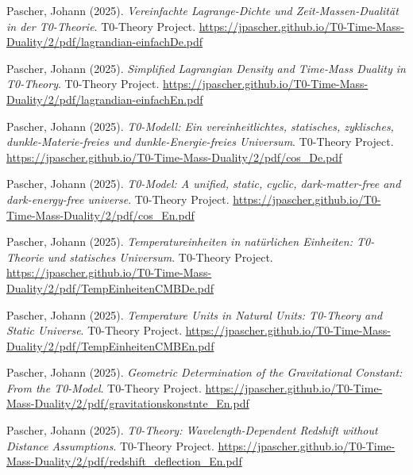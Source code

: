 \documentclass[12pt,a4paper]{article}
\theoremstyle{definition}
\begin{document}
	
	\begin{thebibliography}{99}
		
		Pascher, Johann (2025). 
		\textit{Vereinfachte Lagrange-Dichte und Zeit-Massen-Dualität in der T0-Theorie}. 
		T0-Theory Project. 
		\url{https://jpascher.github.io/T0-Time-Mass-Duality/2/pdf/lagrandian-einfachDe.pdf}
		
		Pascher, Johann (2025). 
		\textit{Simplified Lagrangian Density and Time-Mass Duality in T0-Theory}. 
		T0-Theory Project. 
		\url{https://jpascher.github.io/T0-Time-Mass-Duality/2/pdf/lagrandian-einfachEn.pdf}
		
		Pascher, Johann (2025). 
		\textit{T0-Modell: Ein vereinheitlichtes, statisches, zyklisches, dunkle-Materie-freies und dunkle-Energie-freies Universum}. 
		T0-Theory Project. 
		\url{https://jpascher.github.io/T0-Time-Mass-Duality/2/pdf/cos_De.pdf}
		
		Pascher, Johann (2025). 
		\textit{T0-Model: A unified, static, cyclic, dark-matter-free and dark-energy-free universe}. 
		T0-Theory Project. 
		\url{https://jpascher.github.io/T0-Time-Mass-Duality/2/pdf/cos_En.pdf}
		
		Pascher, Johann (2025). 
		\textit{Temperatureinheiten in natürlichen Einheiten: T0-Theorie und statisches Universum}. 
		T0-Theory Project. 
		\url{https://jpascher.github.io/T0-Time-Mass-Duality/2/pdf/TempEinheitenCMBDe.pdf}
		
		Pascher, Johann (2025). 
		\textit{Temperature Units in Natural Units: T0-Theory and Static Universe}. 
		T0-Theory Project. 
		\url{https://jpascher.github.io/T0-Time-Mass-Duality/2/pdf/TempEinheitenCMBEn.pdf}
		
		Pascher, Johann (2025). 
		\textit{Geometric Determination of the Gravitational Constant: From the T0-Model}. 
		T0-Theory Project. 
		\url{https://jpascher.github.io/T0-Time-Mass-Duality/2/pdf/gravitationskonstnte_En.pdf}
		

		
		Pascher, Johann (2025). 
		\textit{T0-Theory: Wavelength-Dependent Redshift without Distance Assumptions}. 
		T0-Theory Project. 
		\url{https://jpascher.github.io/T0-Time-Mass-Duality/2/pdf/redshift_deflection_En.pdf}
		

\end{thebibliography}
\end{document}
